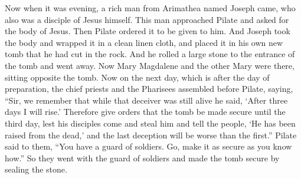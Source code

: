 \begin{biblechapter}
 Now when it was evening, a rich man from Arimathea named Joseph came, who also was a disciple of Jesus himself.
\verse This man approached Pilate and asked for the body of Jesus. Then Pilate ordered it to be given to him.
\verse And Joseph took the body and wrapped it in a clean linen cloth,
\verse and placed it in his own new tomb that he had cut in the rock. And he rolled a large stone to the entrance of the tomb and went away.
\verse Now Mary Magdalene and the other Mary were there, sitting opposite the tomb.
 Now on the next day, which is after the day of preparation, the chief priests and the Pharisees assembled before Pilate,
\verse saying, “Sir, we remember that while that deceiver was still alive he said, ‘After three days I will rise.’
\verse Therefore give orders that the tomb be made secure until the third day, lest his disciples come and steal him and tell the people, ‘He has been raised from the dead,’ and the last deception will be worse than the first.”
\verse Pilate said to them, “You have a guard of soldiers. Go, make it as secure as you know how.”
\verse So they went with the guard of soldiers and made the tomb secure by sealing the stone.
\end{biblechapter}

